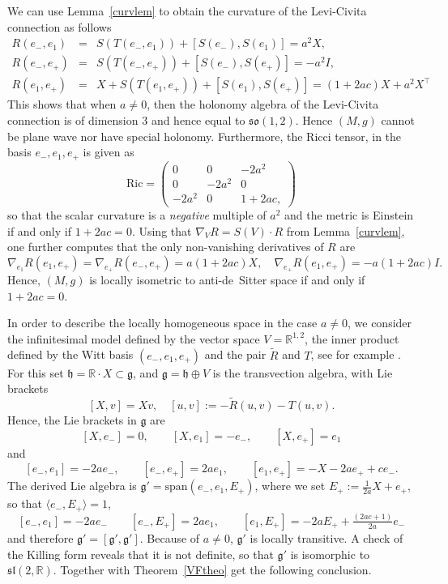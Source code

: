 \documentclass[11pt,a4paper]{amsart}
\newcommand{\tR}{\widetilde{R}}
\newcommand{\g}{\mathfrak{g}}
\newcommand{\h}{\mathfrak{h}}
\renewcommand{\sl}{\mathfrak{sl}}
\newcommand{\+}{\oplus}
\newcommand{\so}{\mathfrak{so}}
\newcommand{\1}{\mathbf{1}}
\newcommand{\R}{\mathbb{R}} %
\newcommand{\<}{\langle}
\renewcommand{\>}{\rangle}
\theoremstyle{definition}
\theoremstyle{plain}
\numberwithin{equation}{section}
\begin{document}
We can use Lemma~\ref{curvlem} to obtain the curvature of the Levi-Civita connection as follows
\begin{eqnarray*}
R(e_-,e_1)&=& S(T(e_-,e_1))+[S(e_-),S(e_1)] =a^2 X,\\
R(e_-,e_+)&=& S(T(e_-,e_+))+[S(e_-),S(e_+)] =-a^2 I,\\
R(e_1,e_+)&=& X+S(T(e_1,e_+))+[S(e_1),S(e_+)] =
(1+2ac)X
+a^2X^\top
\end{eqnarray*}
This shows that when $a\not=0$, then the holonomy algebra of the Levi-Civita connection is of dimension $3$ and hence equal to $\so(1,2)$. Hence $(M,g)$ cannot be plane wave nor have special holonomy. Furthermore,
the Ricci tensor, in the basis $e_-,e_1,e_+$ is given as 
\[
\mathrm{Ric}=\begin{pmatrix}
0&0&-2a^2
\\
0&-2a^2&0
\\
-2a^2&0& 1+2ac,
\end{pmatrix}\]
so that
 the scalar curvature is a {\em negative} multiple of $a^2$ and the metric is Einstein if and only if $1+2ac=0$. Using that 
$\nabla_VR=S(V)\cdot R$ from Lemma~\ref{curvlem}, one further computes that the only non-vanishing derivatives of $R$ are 
\[
\nabla_{e_1}R(e_1,e_+)=\nabla_{e_+}R(e_-,e_+)=a (1+2ac) X, \quad \nabla_{e_+}R(e_1,e_+)=-a (1+2ac) I.\]
Hence,  $(M,g)$ is locally isometric to anti-de~Sitter space if and only if $1+2ac=0$. 



In order to describe the locally homogeneous space in the case $a\not=0$, we consider the infinitesimal model defined by the vector space $V=\R^{1,2}$, the inner product defined by the Witt basis $(e_-,e_1,e_+)$ and the pair $\tR$ and $T$, see for example \cite[Section 2.4]{CalvarusoCastrillon-Lopez19}. For this set $\h=\R\cdot X\subset \g$, and 
 $\g=\h\+V$ is the transvection algebra,  with Lie brackets 
\[ [X,v]=Xv,\quad [u,v]:= -\tR(u,v)-T(u,v).\]
Hence, the Lie brackets in $\g$ are
\[
[X,e_-]=0,\qquad [X,e_1]=-e_-,\qquad [X,e_+]=e_1\]
and
\[ [e_-,e_1] =-2a e_-,\qquad [e_-,e_+]= 2a e_1,\qquad [e_1,e_+]=-X-2ae_++ce_-.\]
The derived Lie algebra is $\g'=\mathrm{span}(e_-,e_1,E_+)$, where we set $
E_+:= \tfrac{1}{2a}X+ e_+$,
so that  $\< e_-,E_+\>=1$,  
\[ [e_-,e_1] =-2a e_-\qquad [e_-,E_+] =2ae_1,\qquad [e_1,E_+] =-2aE_++ \tfrac{(2ac+1)}{2a}e_- \]
and therefore $\g'=[\g',\g']$. Because of  $a\not=0$, $\g'$ is locally transitive. A check of the Killing form reveals that it is not definite, so that $\g'$ is isomorphic to $\sl(2,\R)$.
Together with 
Theorem~\ref{VFtheo} get the following conclusion.
\end{document}
